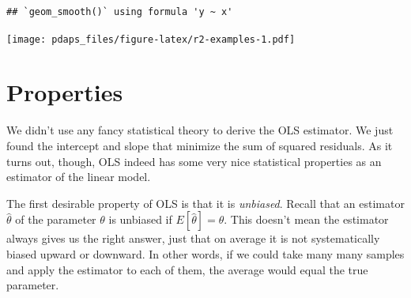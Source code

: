 \documentclass[
  12pt,
  oneside,openany]{book}
\begin{document}
\begin{verbatim}
## `geom_smooth()` using formula 'y ~ x'
\end{verbatim}

\texttt{[image: pdaps\_files/figure-latex/r2-examples-1.pdf]}

\hypertarget{properties}{%
\section{Properties}\label{properties}}

We didn't use any fancy statistical theory to derive the OLS estimator. We just found the intercept and slope that minimize the sum of squared residuals. As it turns out, though, OLS indeed has some very nice statistical properties as an estimator of the linear model.

The first desirable property of OLS is that it is \emph{unbiased}. Recall that an estimator \(\hat{\theta}\) of the parameter \(\theta\) is unbiased if \(E[\hat{\theta}] = \theta\). This doesn't mean the estimator always gives us the right answer, just that on average it is not systematically biased upward or downward. In other words, if we could take many many samples and apply the estimator to each of them, the average would equal the true parameter.
\end{document}
